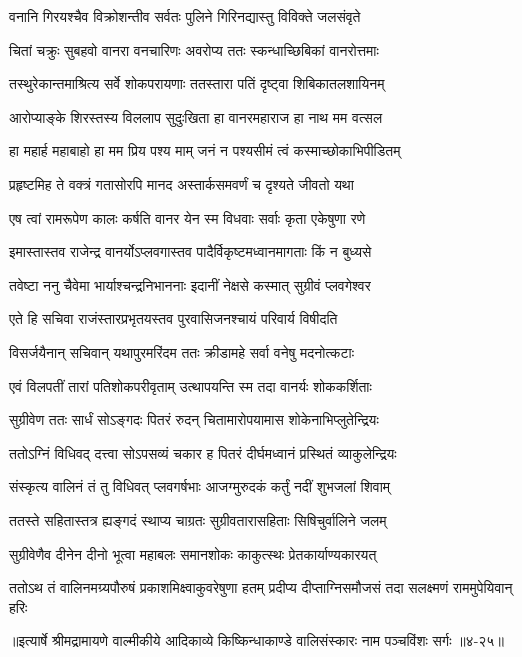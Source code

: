 \twolineshloka
{वनानि गिरयश्चैव विक्रोशन्तीव सर्वतः}
{पुलिने गिरिनद्यास्तु विविक्ते जलसंवृते} %

\twolineshloka
{चितां चक्रुः सुबहवो वानरा वनचारिणः}
{अवरोप्य ततः स्कन्धाच्छिबिकां वानरोत्तमाः} %

\twolineshloka
{तस्थुरेकान्तमाश्रित्य सर्वे शोकपरायणाः}
{ततस्तारा पतिं दृष्ट्वा शिबिकातलशायिनम्} %

\twolineshloka
{आरोप्याङ्के शिरस्तस्य विललाप सुदुःखिता}
{हा वानरमहाराज हा नाथ मम वत्सल} %

\twolineshloka
{हा महार्ह महाबाहो हा मम प्रिय पश्य माम्}
{जनं न पश्यसीमं त्वं कस्माच्छोकाभिपीडितम्} %

\twolineshloka
{प्रहृष्टमिह ते वक्त्रं गतासोरपि मानद}
{अस्तार्कसमवर्णं च दृश्यते जीवतो यथा} %

\twolineshloka
{एष त्वां रामरूपेण कालः कर्षति वानर}
{येन स्म विधवाः सर्वाः कृता एकेषुणा रणे} %

\twolineshloka
{इमास्तास्तव राजेन्द्र वानर्योऽप्लवगास्तव}
{पादैर्विकृष्टमध्वानमागताः किं न बुध्यसे} %

\twolineshloka
{तवेष्टा ननु चैवेमा भार्याश्चन्द्रनिभाननाः}
{इदानीं नेक्षसे कस्मात् सुग्रीवं प्लवगेश्वर} %

\twolineshloka
{एते हि सचिवा राजंस्तारप्रभृतयस्तव}
{पुरवासिजनश्चायं परिवार्य विषीदति} %

\twolineshloka
{विसर्जयैनान् सचिवान् यथापुरमरिंदम}
{ततः क्रीडामहे सर्वा वनेषु मदनोत्कटाः} %

\twolineshloka
{एवं विलपतीं तारां पतिशोकपरीवृताम्}
{उत्थापयन्ति स्म तदा वानर्यः शोककर्शिताः} %

\twolineshloka
{सुग्रीवेण ततः सार्धं सोऽङ्गदः पितरं रुदन्}
{चितामारोपयामास शोकेनाभिप्लुतेन्द्रियः} %

\twolineshloka
{ततोऽग्निं विधिवद् दत्त्वा सोऽपसव्यं चकार ह}
{पितरं दीर्घमध्वानं प्रस्थितं व्याकुलेन्द्रियः} %

\twolineshloka
{संस्कृत्य वालिनं तं तु विधिवत् प्लवगर्षभाः}
{आजग्मुरुदकं कर्तुं नदीं शुभजलां शिवाम्} %

\twolineshloka
{ततस्ते सहितास्तत्र ह्यङ्गदं स्थाप्य चाग्रतः}
{सुग्रीवतारासहिताः सिषिचुर्वालिने जलम्} %

\twolineshloka
{सुग्रीवेणैव दीनेन दीनो भूत्वा महाबलः}
{समानशोकः काकुत्स्थः प्रेतकार्याण्यकारयत्} %

\twolineshloka
{ततोऽथ तं वालिनमग्र्यपौरुषं प्रकाशमिक्ष्वाकुवरेषुणा हतम्}
{प्रदीप्य दीप्ताग्निसमौजसं तदा सलक्ष्मणं राममुपेयिवान् हरिः} %


॥इत्यार्षे श्रीमद्रामायणे वाल्मीकीये आदिकाव्ये किष्किन्धाकाण्डे वालिसंस्कारः नाम पञ्चविंशः सर्गः ॥४-२५॥
